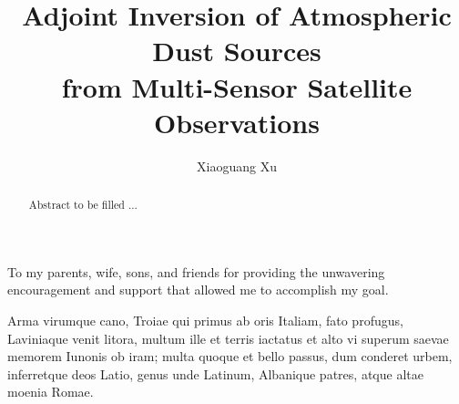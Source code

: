 \documentclass[phd, print]{nuthesis}
\begin{document}
\frontmatter

\title{Adjoint Inversion of Atmospheric Dust Sources  \\ from Multi-Sensor Satellite Observations}
\author{Xiaoguang Xu}
\maketitle
\begin{abstract}
  Abstract to be filled ...
\end{abstract}


\begin{dedication}
  To my parents, wife, sons, and friends for providing the unwavering 
  encouragement and support that allowed me to accomplish my goal.
\end{dedication}

\begin{acknowledgments}
  Arma virumque cano, Troiae qui primus ab oris Italiam, fato
  profugus, Laviniaque venit litora, multum ille et terris iactatus et
  alto vi superum saevae memorem Iunonis ob iram; multa quoque et
  bello passus, dum conderet urbem, inferretque deos Latio, genus unde
  Latinum, Albanique patres, atque altae moenia Romae.
\end{acknowledgments}
\end{document}
